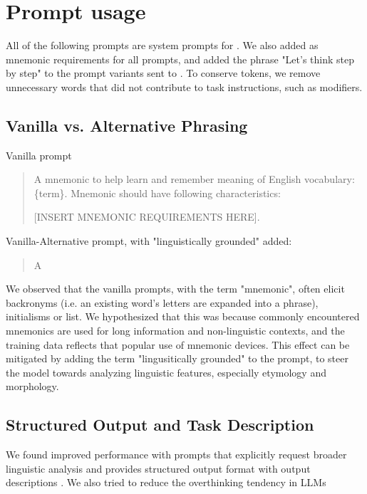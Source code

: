
\section{Prompt usage} \label{app:prompt-usage}

All of the following prompts are system prompts for \teachermodel. We also added  as mnemonic requirements for all prompts, and added the phrase "Let's think step by step" to the prompt variants sent to \xteachermodel. To conserve tokens, we remove unnecessary words that did not contribute to task instructions, such as modifiers.

\subsection*{Vanilla vs. Alternative Phrasing}

Vanilla prompt
\begin{quotation}
  A mnemonic to help learn and remember meaning of English vocabulary: \{term\}. Mnemonic should have following characteristics:

  [INSERT MNEMONIC REQUIREMENTS HERE].
\end{quotation}

Vanilla-Alternative prompt, with "linguistically grounded" added:
\begin{quotation}
  A \lgm
\end{quotation}

We observed that the vanilla prompts, with the term "mnemonic", often elicit backronyms (i.e. an existing word's letters are expanded into a phrase), initialisms or list. We hypothesized that this was because commonly encountered mnemonics are used for long information and non-linguistic contexts, and the training data reflects that popular use of mnemonic devices. This effect can be mitigated by adding the term "lingusitically grounded" to the prompt, to steer the model towards analyzing linguistic features, especially etymology and morphology.

\subsection*{Structured Output and Task Description}
We found improved performance with prompts that explicitly request broader linguistic analysis and provides structured output format with output descriptions \citep{MishraREFRAMING2022,yinDidYouRead2023}. We also tried to reduce the overthinking tendency in LLMs

